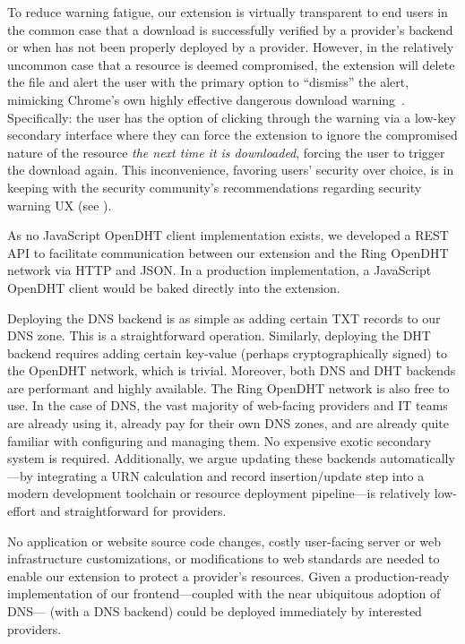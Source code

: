 To reduce warning fatigue, our extension is virtually transparent to end users
in the common case that a download is successfully verified by a provider's
backend or when \SYSTEM{} has not been properly deployed by a provider. However,
in the relatively uncommon case that a resource is deemed compromised, the
extension will delete the file and alert the user with the primary option to
``dismiss'' the alert, mimicking Chrome's own highly effective dangerous
download warning~\cite{ChromeClickThrough}. Specifically: the user has the
option of clicking through the warning via a low-key secondary interface where
they can force the extension to ignore the compromised nature of the resource
\emph{the next time it is downloaded}, forcing the user to trigger the download
again. This inconvenience, favoring users' security over choice, is in keeping
with the security community's recommendations regarding security warning UX (see
).

As no JavaScript OpenDHT client implementation exists, we developed a REST API
to facilitate communication between our extension and the Ring OpenDHT network
via HTTP and JSON. In a production implementation, a JavaScript OpenDHT client
would be baked directly into the extension.

Deploying the DNS backend is as simple as adding certain TXT records to our DNS
zone. This is a straightforward operation. Similarly, deploying the DHT backend
requires adding certain key-value (perhaps cryptographically signed) to the
OpenDHT network, which is trivial. Moreover, both DNS and DHT backends are
performant and highly available. The Ring OpenDHT network is also free to use.
In the case of DNS, the vast majority of web-facing providers and IT teams are
already using it, already pay for their own DNS zones, and are already quite
familiar with configuring and managing them. No expensive exotic secondary
system is required. Additionally, we argue updating these backends
automatically---by integrating a URN calculation and record insertion/update
step into a modern development toolchain or resource deployment pipeline---is
relatively low-effort and straightforward for providers.

No application or website source code changes, costly user-facing server or web
infrastructure customizations, or modifications to web standards are needed to
enable our extension to protect a provider's resources. Given a production-ready
implementation of our frontend---coupled with the near ubiquitous adoption of
DNS---\SYSTEM{} (with a DNS backend) could be deployed immediately by interested
providers.

